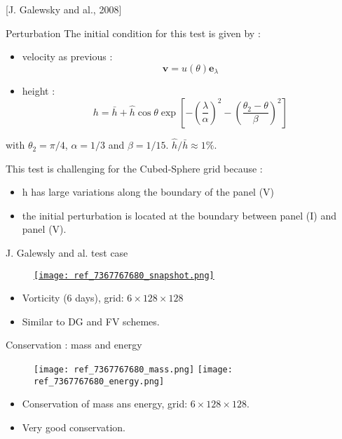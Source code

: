 \documentclass[11pt]{beamer}
\begin{document}
\begin{frame}{[J. Galewsky and al., 2008]}
\begin{block}{Perturbation}
The initial condition for this test is given by :
\begin{itemize}
\item velocity as previous :
$$\mathbf{v} = u(\theta) \mathbf{e}_{\lambda}$$
\item height :
$$h = \bar{h} + \hat{h} \cos \theta \exp \left[ - \left( \dfrac{\lambda}{\alpha} \right)^2 - \left( \dfrac{\theta_2 - \theta}{\beta} \right)^2 \right]$$
\end{itemize}
\end{block}

with $\theta_2 = \pi/4$, $\alpha = 1/3$ and $\beta = 1/15$. $\hat{h}/\bar{h} \approx 1 \%$.

\begin{block}{}
This test is challenging for the Cubed-Sphere grid because :

\begin{itemize}
\item h has large variations along the boundary of the panel (V)
\item the initial perturbation is located at the boundary between panel (I) and panel (V).
\end{itemize}
\end{block}
\end{frame}


\begin{frame}{J. Galewsly and al. test case}
\begin{figure}
\href{run:ref_7367787500.avi}{\texttt{[image: ref\_7367767680\_snapshot.png]}} 
\end{figure}
\begin{itemize}
\item Vorticity (6 days), grid: $6 \times 128 \times 128$
\item Similar to DG and FV schemes.
\end{itemize}
\end{frame}

\begin{frame}{Conservation : mass and energy}
\begin{figure}
\texttt{[image: ref\_7367767680\_mass.png]}
\texttt{[image: ref\_7367767680\_energy.png]}
\end{figure}
\begin{itemize}
\item Conservation of mass ans energy, grid: $6 \times 128 \times 128$.
\item Very good conservation.
\end{itemize}
\end{frame}
\end{document}
